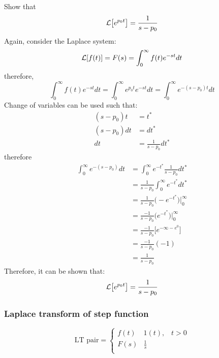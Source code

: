 \documentclass[12pt,letter]{article}
\begin{document}
\begin{mdframed}[middlelinewidth=0.5mm]
\begin{center}
\end{center}
Show that
\begin{equation}
\mathcal{L}{\left[e^{p_0t}\right]} = \frac{1}{s -p_0} 
\end{equation}
Again, consider the Laplace system:
\begin{equation}
		\mathcal{L}{\left[f(t)\right]} = F(s) = \int_{0}^{\infty} f(t)e^{-st}dt
\end{equation}
therefore, 
\begin{equation}
	\int_{0}^{\infty}f(t)e^{-s t} dt =  \int_{0}^{\infty}e^{p_0t}e^{-st}dt = \int_{0}^{\infty}e^{-(s-p_0)t}dt
\end{equation}
Change of variables can be used such that:
\begin{align}
(s-p_0)t &= t^*  \\ \nonumber
(s-p_0)dt &= dt^*  \\ \nonumber
dt &= \frac{1}{s-p_0}dt^*
\end{align}
therefore
\begin{align}
	\int_{0}^{\infty}e^{-(s-p_0)} dt &=  \int_{0}^{\infty}e^{-t^*}\frac{1}{s-p_0}dt^*  \\ \nonumber
	&= \frac{1}{s-p_0} \int_{0}^{\infty}e^{-t^*} dt^*  \\ \nonumber
&= \frac{1}{s-p_0} \big(-e^{-t^*}\big) \bigg|^\infty_0 \\ \nonumber
&= \frac{-1}{s-p_0} \big(e^{-t^*}\big) \bigg|^\infty_0 \\ \nonumber
&= \frac{-1}{s-p_0} \big[e^{-\infty - e^0}\big] \\ \nonumber
&= \frac{-1}{s-p_0} (-1) \\ \nonumber
&= \frac{1}{s-p_0}
\end{align}
Therefore, it can be shown that:
\begin{equation}
\mathcal{L}{\left[e^{p_0t}\right]} = \frac{1}{s -p_0} 
\end{equation}
\end{mdframed}



		\subsubsection{Laplace transform of step function}

		\begin{equation}
		\text{LT pair} =
			\begin{cases}
			f(t) & 1(t) , \; \; \; t>0 \\
			F(s) & \frac{1}{s} \\
			\end{cases}
		\end{equation}
\end{document}
